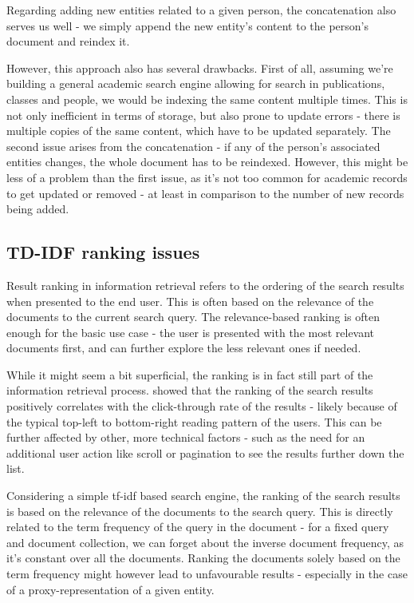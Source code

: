 Regarding adding new entities related to a given person, the concatenation also serves us well - we simply append the new entity's content to the person's document and reindex it.

However, this approach also has several drawbacks. First of all, assuming we're building a general academic search engine allowing for search in publications, classes and people, we would be indexing the same content multiple times.
This is not only inefficient in terms of storage, but also prone to update errors - there is multiple copies of the same content, which have to be updated separately.
The second issue arises from the concatenation - if any of the person's associated entities changes, the whole document has to be reindexed.
However, this might be less of a problem than the first issue, as it's not too common for academic records to get updated or removed - at least in comparison to the number of new records being added.

\subsection{TD-IDF ranking issues} \label{search-ranking-issues}

Result ranking in information retrieval refers to the ordering of the search results when presented to the end user. This is often based on the relevance of the documents to the current search query.
The relevance-based ranking is often enough for the basic use case - the user is presented with the most relevant documents first, and can further explore the less relevant ones if needed.

While it might seem a bit superficial, the ranking is in fact still part of the information retrieval process. 
\cite{ranking-user-choice} showed that
the ranking of the search results positively correlates with the click-through rate of the results 
- likely because of the typical top-left to bottom-right reading pattern of the users.
This can be further affected by other, more technical factors - such as the need for an additional user action like scroll or pagination to see the results further down the list.


Considering a simple tf-idf based search engine, the ranking of the search results is based on the relevance of the documents to the search query.
This is directly related to the term frequency of the query in the document - for a fixed query and document collection, we can forget about the inverse document frequency, as it's constant over all the documents.
Ranking the documents solely based on the term frequency might however lead to unfavourable results - especially in the case of a proxy-representation of a given entity.


